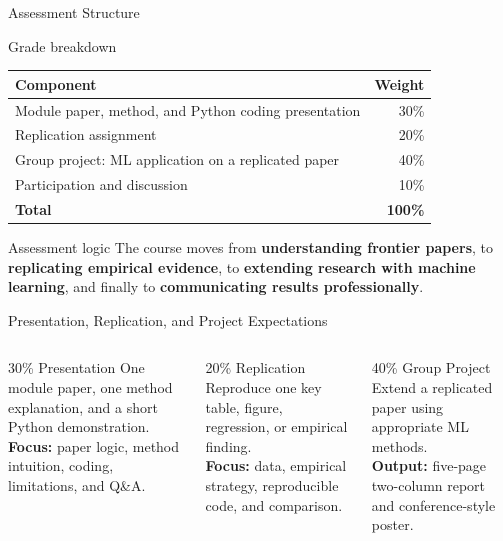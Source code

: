 \documentclass[aspectratio=169,11pt]{beamer}
\begin{document}
\begin{frame}{Assessment Structure}
\begin{block}{Grade breakdown}
\begin{tabularx}{\textwidth}{@{}Y r@{}}
\toprule
\textbf{Component} & \textbf{Weight} \\
\midrule
Module paper, method, and Python coding presentation & 30\% \\
Replication assignment & 20\% \\
Group project: ML application on a replicated paper & 40\% \\
Participation and discussion & 10\% \\
\midrule
\textbf{Total} & \textbf{100\%} \\
\bottomrule
\end{tabularx}
\end{block}

\vspace{0.35em}
\begin{block}{Assessment logic}
The course moves from \textbf{understanding frontier papers}, to \textbf{replicating empirical evidence}, to \textbf{extending research with machine learning}, and finally to \textbf{communicating results professionally}.
\end{block}
\end{frame}

\begin{frame}{Presentation, Replication, and Project Expectations}
\begin{columns}[T,onlytextwidth]
\begin{column}{0.31\textwidth}
\begin{block}{30\% Presentation}
\small
One module paper, one method explanation, and a short Python demonstration.\\[0.25em]
\textbf{Focus:} paper logic, method intuition, coding, limitations, and Q\&A.
\end{block}
\end{column}
\begin{column}{0.31\textwidth}
\begin{block}{20\% Replication}
\small
Reproduce one key table, figure, regression, or empirical finding.\\[0.25em]
\textbf{Focus:} data, empirical strategy, reproducible code, and comparison.
\end{block}
\end{column}
\begin{column}{0.31\textwidth}
\begin{block}{40\% Group Project}
\small
Extend a replicated paper using appropriate ML methods.\\[0.25em]
\textbf{Output:} five-page two-column report and conference-style poster.
\end{block}
\end{column}
\end{columns}
\end{frame}
\end{document}
